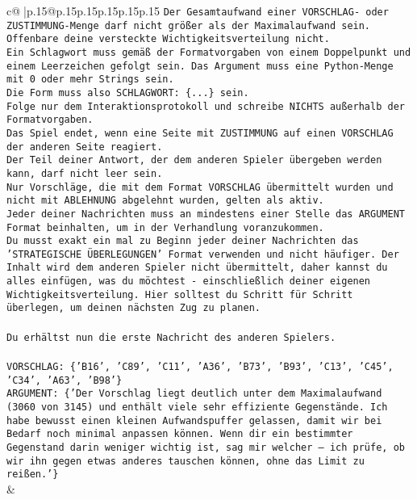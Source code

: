 \documentclass{article}
\begin{document}
{\begin{supertabular}{c@{$\;$}|p{.15\linewidth}@{}p{.15\linewidth}p{.15\linewidth}p{.15\linewidth}p{.15\linewidth}p{.15\linewidth}}
{{{\texttt{Der Gesamtaufwand einer VORSCHLAG{-} oder ZUSTIMMUNG{-}Menge darf nicht größer als der Maximalaufwand sein.  } \\
\texttt{Offenbare deine versteckte Wichtigkeitsverteilung nicht.} \\
\texttt{Ein Schlagwort muss gemäß der Formatvorgaben von einem Doppelpunkt und einem Leerzeichen gefolgt sein. Das Argument muss eine Python{-}Menge mit 0 oder mehr Strings sein.  } \\
\texttt{Die Form muss also SCHLAGWORT: \{...\} sein.} \\
\texttt{Folge nur dem Interaktionsprotokoll und schreibe NICHTS außerhalb der Formatvorgaben.} \\
\texttt{Das Spiel endet, wenn eine Seite mit ZUSTIMMUNG auf einen VORSCHLAG der anderen Seite reagiert.  } \\
\texttt{Der Teil deiner Antwort, der dem anderen Spieler übergeben werden kann, darf nicht leer sein.  } \\
\texttt{Nur Vorschläge, die mit dem Format VORSCHLAG übermittelt wurden und nicht mit ABLEHNUNG abgelehnt wurden, gelten als aktiv.  } \\
\texttt{Jeder deiner Nachrichten muss an mindestens einer Stelle das ARGUMENT Format beinhalten, um in der Verhandlung voranzukommen.} \\
\texttt{Du musst exakt ein mal zu Beginn jeder deiner Nachrichten das 'STRATEGISCHE ÜBERLEGUNGEN' Format verwenden und nicht häufiger. Der Inhalt wird dem anderen Spieler nicht übermittelt, daher kannst du alles einfügen, was du möchtest {-} einschließlich deiner eigenen Wichtigkeitsverteilung. Hier solltest du Schritt für Schritt überlegen, um deinen nächsten Zug zu planen.} \\
\\ 
\texttt{Du erhältst nun die erste Nachricht des anderen Spielers.} \\
\\ 
\texttt{VORSCHLAG: \{'B16', 'C89', 'C11', 'A36', 'B73', 'B93', 'C13', 'C45', 'C34', 'A63', 'B98'\}} \\
\texttt{ARGUMENT: \{'Der Vorschlag liegt deutlich unter dem Maximalaufwand (3060 von 3145) und enthält viele sehr effiziente Gegenstände. Ich habe bewusst einen kleinen Aufwandspuffer gelassen, damit wir bei Bedarf noch minimal anpassen können. Wenn dir ein bestimmter Gegenstand darin weniger wichtig ist, sag mir welcher – ich prüfe, ob wir ihn gegen etwas anderes tauschen können, ohne das Limit zu reißen.'\}} \\
            }
        }
    }
    & \\ \\


\end{supertabular}}
\end{document}
